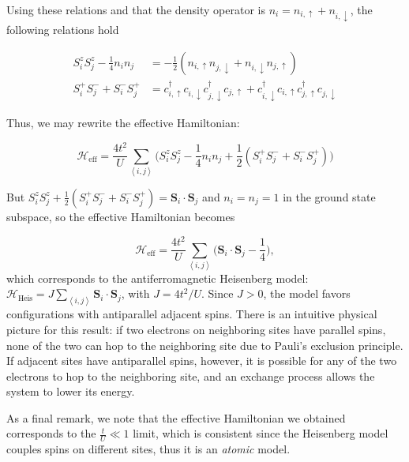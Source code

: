 Using these relations and that the density operator is $n_i = n_{i,\uparrow} + n_{i,\downarrow}$, the following relations hold

\begin{equation}
\begin{split}
S_i^z S_j^z - \frac{1}{4} n_i n_j &= -\frac{1}{2} ( n_{i,\uparrow} n_{j,\downarrow} + n_{i,\downarrow} n_{j,\uparrow} ) \\
S_i^+ S_j^- + S_i^- S_j^+ &= c_{i,\uparrow}^\dagger c_{i,\downarrow} c_{j,\downarrow}^\dagger  c_{j,\uparrow} +  c_{i,\downarrow}^\dagger c_{i,\uparrow} c_{j,\uparrow}^\dagger  c_{j,\downarrow}
\end{split}
\end{equation}

Thus, we may rewrite the effective Hamiltonian:

\begin{equation}
\mathcal{H}_{\text{eff}} = \frac{4t^2}{U} \sum_{\left\langle i, j \right\rangle} \bigg( S_i^z S_j^z - \frac{1}{4} n_i n_j + \frac{1}{2} ( S_i^+ S_j^- + S_i^- S_j^+ ) \bigg)
\end{equation}

But $S_i^z S_j^z + \frac{1}{2} ( S_i^+ S_j^- + S_i^- S_j^+) = \bm S_i \cdot \bm S_j$ and $n_i = n_j = 1$ in the ground state subspace, so the effective Hamiltonian becomes

\begin{equation}
\mathcal{H}_{\text{eff}} = \frac{4t^2}{U} \sum_{\left\langle i, j \right\rangle} \bigg( \bm S_i \cdot \bm S_j  - \frac{1}{4}  \bigg),
\end{equation}
which corresponds to the antiferromagnetic Heisenberg model: $\mathcal{H}_{\text{Heis}} = J \sum_{\left\langle i, j \right\rangle} \bm S_i \cdot \bm S_j $, with $J = 4 t^2 / U$.
Since $J > 0$, the model favors configurations with antiparallel adjacent spins.
There is an intuitive physical picture for this result: if two electrons on neighboring sites have parallel spins, none of the two can hop to the neighboring site due to Pauli's exclusion principle.
If adjacent sites have antiparallel spins, however, it is possible for any of the two electrons to hop to the neighboring site, and an exchange  process allows the system to lower its energy.

As a final remark, we note that the effective Hamiltonian we obtained corresponds to the $\frac{t}{U} \ll 1$ limit, which is consistent since the Heisenberg model couples spins on different sites, thus it is an \emph{atomic} model.